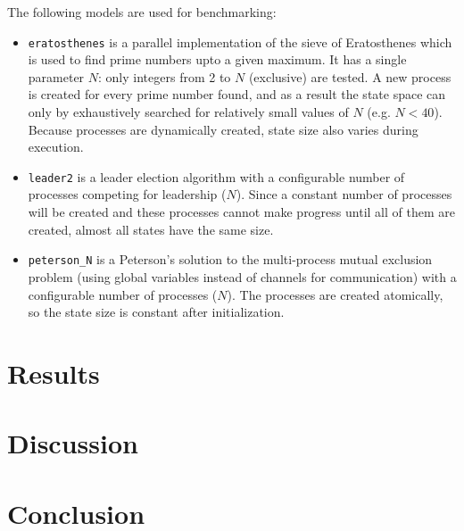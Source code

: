 \documentclass{acm_proc_article-sp}
\begin{document}
The following models are used for benchmarking:
\begin{itemize}
\item\verb#eratosthenes# is a parallel implementation of the sieve
of Eratosthenes which is used to find prime numbers upto a given maximum.
It has a single parameter $N$: only integers from 2 to $N$ (exclusive) are
tested. A new process is created for every prime number found, and as a result
the state space can only by exhaustively searched for relatively small values
of $N$ (e.g. $N < 40$). Because processes are dynamically created, state size
also varies during execution.

\item\verb#leader2# is a leader election algorithm with a configurable number
of processes competing for leadership ($N$). Since a constant number of
processes will be created and these processes cannot make progress until all
of them are created, almost all states have the same size.

\item\verb#peterson_N# is a Peterson's solution to the multi-process mutual
exclusion problem (using global variables instead of channels for
communication) with a configurable number of processes ($N$). The processes
are created atomically, so the state size is constant after initialization.



\end{itemize}

\section{Results}
%
%   

\section{Discussion}

\section{Conclusion}



\end{document}
